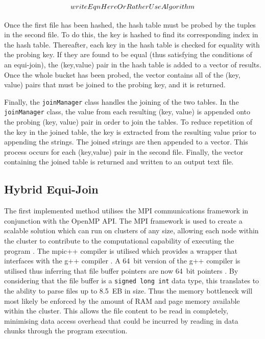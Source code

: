 \documentclass[10pt,twocolumn]{witseiepaper}
\begin{document}
\begin{equation}
 writeEqnHereOrRatherUseAlgorithm\\
\label{eqn:hash}
\end{equation}

Once the first file has been hashed, the hash table must be probed by the tuples in the second file. To do this, the key is hashed to find its corresponding index in the hash table. Thereafter, each key in the hash table is checked for equality with the probing key. If they are found to be equal (thus satisfying the conditions of an equi-join), the (key,value) pair in the hash table is added to a vector of results. Once the whole bucket has been probed, the vector contains all of the (key, value) pairs that must be joined to the probing key, and it is returned.

Finally, the \texttt{joinManager} class handles the joining of the two tables. In the \texttt{joinManager} class, the value from each resulting (key, value) is appended onto the probing (key, value) pair in order to join the tables. To reduce repetition of the key in the joined table, the key is extracted from the resulting value prior to appending the strings. The joined strings are then appended to a vector. This process occurs for each (key,value) pair in the second file. Finally, the vector containing the joined table is returned and written to an output text file.

\subsection{Hybrid Equi-Join}
The first implemented method utilises the MPI communications framework in conjunction with the OpenMP API. The MPI framework is used to create a scalable solution which can run on clusters of any size, allowing each node within the cluster to contribute to the computational capability of executing the program \cite{mpi-scale}. The mpic++ compiler is utilised which provides a wrapper that interfaces with the g++ compiler \cite{mpic++-wrapper}. A 64~bit version of the g++ compiler is utilised thus inferring that file buffer pointers are now 64~bit pointers \cite{pointer-size}. By considering that the file buffer is a \texttt{signed long int} data type, this translates to the ability to parse files up to 8.5~EB in size. Thus the memory bottleneck will most likely be enforced by the amount of RAM and page memory available within the cluster. This allows the file content to be read in completely, minimising data access overhead that could be incurred by reading in data chunks through the program execution.
\end{document}
